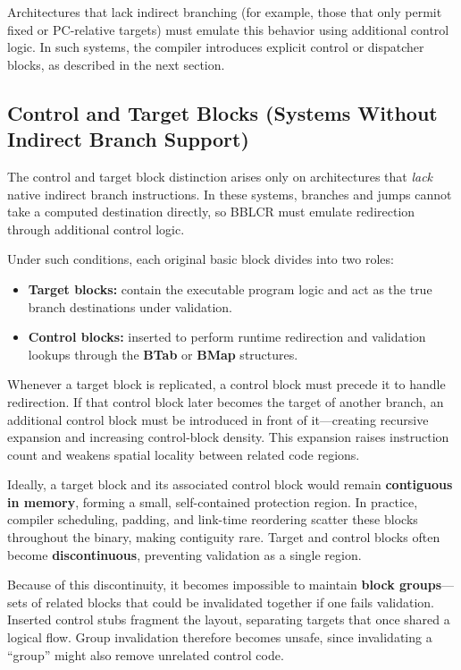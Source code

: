 Architectures that lack indirect branching (for example, those that only permit fixed
or PC-relative targets) must emulate this behavior using additional control logic.
In such systems, the compiler introduces explicit control or dispatcher blocks,
as described in the next section.

\subsection*{Control and Target Blocks (Systems Without Indirect Branch Support)}
The control and target block distinction arises only on architectures that \emph{lack}
native indirect branch instructions.  In these systems, branches and jumps cannot take
a computed destination directly, so BBLCR must emulate redirection through additional
control logic.

Under such conditions, each original basic block divides into two roles:

\begin{itemize}
  \item \textbf{Target blocks:} contain the executable program logic and act as the true
        branch destinations under validation.
  \item \textbf{Control blocks:} inserted to perform runtime redirection and validation
        lookups through the \textbf{BTab} or \textbf{BMap} structures.
\end{itemize}

Whenever a target block is replicated, a control block must precede it to handle redirection.
If that control block later becomes the target of another branch, an additional control
block must be introduced in front of it—creating recursive expansion and increasing
control-block density.  This expansion raises instruction count and weakens spatial locality
between related code regions.

Ideally, a target block and its associated control block would remain \textbf{contiguous in memory},
forming a small, self-contained protection region.  In practice, compiler scheduling, padding,
and link-time reordering scatter these blocks throughout the binary, making contiguity rare.
Target and control blocks often become \textbf{discontinuous}, preventing validation as a single region.

Because of this discontinuity, it becomes impossible to maintain \textbf{block groups}—sets of
related blocks that could be invalidated together if one fails validation.  Inserted control
stubs fragment the layout, separating targets that once shared a logical flow.  Group invalidation
therefore becomes unsafe, since invalidating a ``group'' might also remove unrelated control code.

